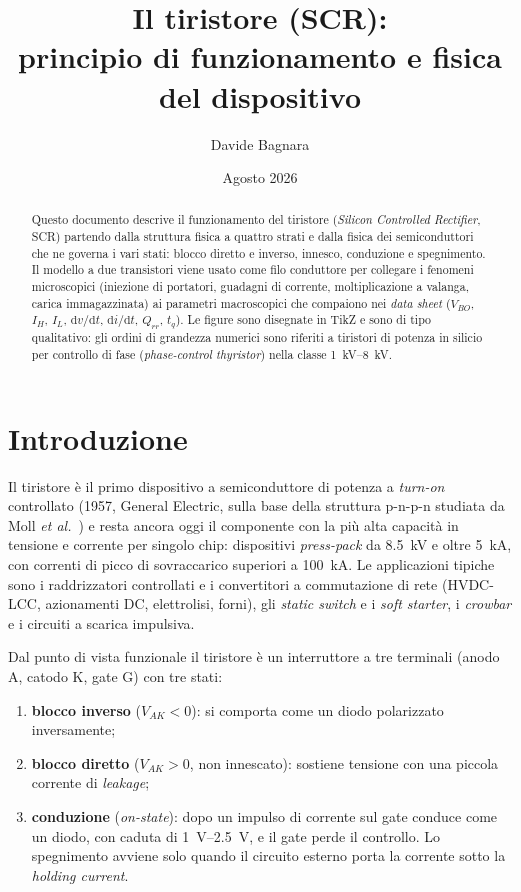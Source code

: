 \documentclass[11pt,a4paper]{article}
\title{Il tiristore (SCR):\\ principio di funzionamento e fisica del dispositivo}
\author{Davide Bagnara}
\date{Agosto 2026}
\newcommand{\VAK}{\ensuremath{V_{AK}}}
\newcommand{\IH}{\ensuremath{I_H}}
\newcommand{\IL}{\ensuremath{I_L}}
\newcommand{\VBO}{\ensuremath{V_{BO}}}
\newcommand{\tq}{\ensuremath{t_q}}
\newcommand{\dvdt}{\ensuremath{\mathrm{d}v/\mathrm{d}t}}
\newcommand{\didt}{\ensuremath{\mathrm{d}i/\mathrm{d}t}}
\newcommand{\en}[1]{\emph{#1}}   %
\begin{document}
\maketitle

\begin{abstract}
Questo documento descrive il funzionamento del tiristore (\en{Silicon Controlled Rectifier}, SCR) partendo dalla struttura fisica a quattro strati e dalla fisica dei semiconduttori che ne governa i vari stati: blocco diretto e inverso, innesco, conduzione e spegnimento. Il modello a due transistori viene usato come filo conduttore per collegare i fenomeni microscopici (iniezione di portatori, guadagni di corrente, moltiplicazione a valanga, carica immagazzinata) ai parametri macroscopici che compaiono nei \en{data sheet} (\VBO, \IH, \IL, $\dvdt$, $\didt$, $Q_{rr}$, \tq). Le figure sono disegnate in TikZ e sono di tipo qualitativo: gli ordini di grandezza numerici sono riferiti a tiristori di potenza in silicio per controllo di fase (\en{phase-control thyristor}) nella classe \qtyrange{1}{8}{\kV}.
\end{abstract}

\tableofcontents
\clearpage

\section{Introduzione}
Il tiristore è il primo dispositivo a semiconduttore di potenza a \en{turn-on} controllato (1957, General Electric, sulla base della struttura p-n-p-n studiata da Moll \en{et al.}~\cite{moll1956}) e resta ancora oggi il componente con la più alta capacità in tensione e corrente per singolo chip: dispositivi \en{press-pack} da \qty{8.5}{\kV} e oltre \qty{5}{\kA}, con correnti di picco di sovraccarico superiori a \qty{100}{\kA}. Le applicazioni tipiche sono i raddrizzatori controllati e i convertitori a commutazione di rete (HVDC-LCC, azionamenti DC, elettrolisi, forni), gli \en{static switch} e i \en{soft starter}, i \en{crowbar} e i circuiti a scarica impulsiva.

Dal punto di vista funzionale il tiristore è un interruttore a tre terminali (anodo A, catodo K, gate G) con tre stati:
\begin{enumerate}
  \item \textbf{blocco inverso} ($\VAK<0$): si comporta come un diodo polarizzato inversamente;
  \item \textbf{blocco diretto} ($\VAK>0$, non innescato): sostiene tensione con una piccola corrente di \en{leakage};
  \item \textbf{conduzione} (\en{on-state}): dopo un impulso di corrente sul gate conduce come un diodo, con caduta di \qtyrange{1}{2.5}{\V}, e il gate perde il controllo. Lo spegnimento avviene solo quando il circuito esterno porta la corrente sotto la \en{holding current}.
\end{enumerate}
\end{document}
